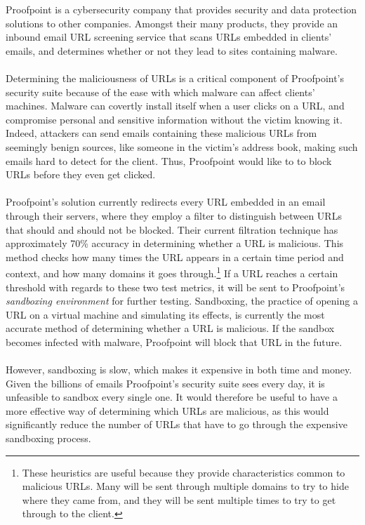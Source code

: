 \documentclass[cs,proposal]{hmcclinic}
\begin{document}
Proofpoint is a cybersecurity company that provides security and data protection solutions to other companies. Amongst their many products, they provide an inbound email URL screening service that scans URLs embedded in clients' emails, and determines whether or not they lead to sites containing malware.
\\\\
Determining the maliciousness of URLs is a critical component of Proofpoint's security suite because of the ease with which malware can affect clients' machines. Malware can covertly install itself when a user clicks on a URL, and compromise personal and sensitive information without the victim knowing it. Indeed, attackers can send emails containing these malicious URLs from seemingly benign sources, like someone in the victim's address book, making such emails hard to detect for the client. Thus, Proofpoint would like to to block URLs before they even get clicked.
\\\\
Proofpoint's solution currently redirects every URL embedded in an email through their servers, where they employ a filter to distinguish between URLs that should and should not be blocked. Their current filtration technique has approximately 70\% accuracy in determining whether a URL is malicious. This method checks how many times the URL appears in a certain time period and context, and how many domains it goes through.\footnote{These heuristics are useful because they provide characteristics common to malicious URLs. Many will be sent through multiple domains to try to hide where they came from, and they will be sent multiple times to try to get through to the client.} If a URL reaches a certain threshold with regards to these two test metrics, it will be sent to Proofpoint's \textit{sandboxing environment} for further testing. Sandboxing, the practice of opening a URL on a virtual machine and simulating its effects, is currently the most accurate method of determining whether a URL is malicious. If the sandbox becomes infected with malware, Proofpoint will block that URL in the future.
\\\\
However, sandboxing is slow, which makes it expensive in both time and money. Given the billions of emails Proofpoint's security suite sees every day, it is unfeasible to sandbox every single one. It would therefore be useful to have a more effective way of determining which URLs are malicious, as this would significantly reduce the number of URLs that have to go through the expensive sandboxing process.
\end{document}

